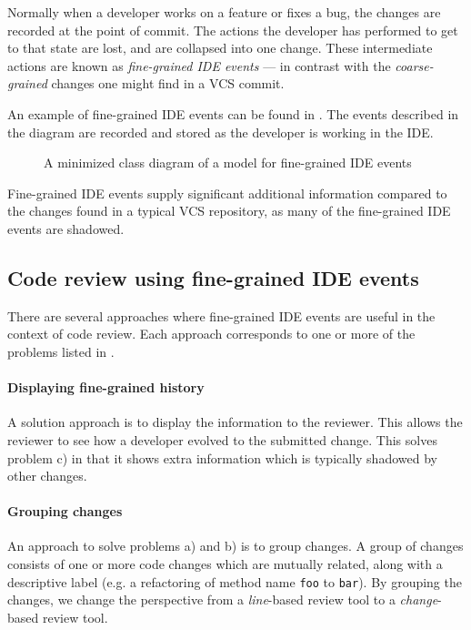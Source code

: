 \documentclass[conference,a4paper]{IEEEtran}
\newcommand{\code}[1]{\texttt{#1}}
\begin{document}
Normally when a developer works on a feature or fixes a bug, the
changes are recorded at the point of commit. The actions the developer
has performed to get to that state are lost, and are collapsed into
one change. These intermediate actions are known as
\textit{fine-grained IDE events} --- in contrast with the
\textit{coarse-grained} changes one might find in a VCS commit.

An example of fine-grained IDE events can be found in
. The events described in the diagram
are recorded and stored as the developer is working in the IDE.
\begin{figure}[h]
  \centering
  \resizebox{!}{0.3\textheight}{%
    
  }
  \caption{A minimized class diagram of a model for fine-grained IDE
    events}
  \label{fig:ide-event-class-model}
\end{figure}

Fine-grained IDE events supply significant additional information
compared to the changes found in a typical VCS repository, as many of
the fine-grained IDE events are shadowed\cite{Nega12a}.

\subsection{Code review using fine-grained IDE events}
\label{sec:code-review-using-1}

There are several approaches where fine-grained IDE events are useful
in the context of code review. Each approach corresponds to one or
more of the problems listed in .

\paragraph{Displaying fine-grained history}

A solution approach is to display the information to the
reviewer. This allows the reviewer to see how a developer evolved to
the submitted change. This solves problem c) in that it shows extra
information which is typically shadowed by other changes.

\paragraph{Grouping changes}

An approach to solve problems a) and b) %
is to group changes. A group of changes consists of one or more code
changes which are mutually related, along with a descriptive label
(e.g. a refactoring of method name \code{foo} to \code{bar}). By
grouping the changes, we change the perspective from a
\textit{line}-based review tool to a \textit{change}-based review
tool.
\end{document}
